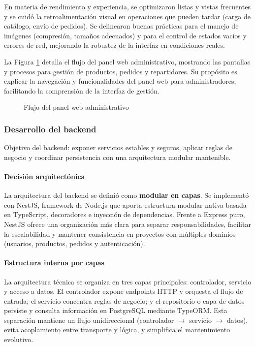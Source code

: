   En materia de rendimiento y experiencia, se optimizaron listas y vistas frecuentes y se cuidó la
  retroalimentación visual en operaciones que pueden tardar (carga de catálogo, envío de pedidos).
  Se delinearon buenas prácticas para el manejo de imágenes (compresión, tamaños adecuados) y
  para el control de estados vacíos y errores de red, mejorando la robustez de la interfaz en condiciones
  reales.

  La Figura \ref{fig:web-panel-prototipo} detalla el flujo del panel web administrativo, mostrando las pantallas y procesos para gestión de productos, pedidos y repartidores. Su propósito es explicar la navegación y funcionalidades del panel web para administradores, facilitando la comprensión de la interfaz de gestión.

  \begin{figure}[htbp]
  \centering
  \resizebox{0.95\textwidth}{!}{}
  \caption[Flujo panel web]{Flujo del panel web administrativo}
  \label{fig:web-panel-prototipo}
  \end{figure}

  \subsubsection{Desarrollo del backend }
  Objetivo del backend: exponer servicios estables y seguros, aplicar reglas de negocio y coordinar persistencia con una arquitectura modular mantenible.

  \paragraph{Decisión arquitectónica}
  La arquitectura del backend se definió como \textbf{modular en capas}. Se implementó con NestJS, framework de Node.js que aporta estructura modular nativa basada en TypeScript, decoradores e inyección de dependencias. Frente a Express puro, NestJS ofrece una organización más clara para separar responsabilidades, facilitar la escalabilidad y mantener consistencia en proyectos con múltiples dominios (usuarios, productos, pedidos y autenticación).

  \paragraph{Estructura interna por capas}
  La arquitectura técnica se organiza en tres capas principales: controlador, servicio y acceso a datos. El controlador expone endpoints HTTP y orquesta el flujo de entrada; el servicio concentra reglas de negocio; y el repositorio o capa de datos persiste y consulta información en PostgreSQL mediante TypeORM. Esta separación mantiene un flujo unidireccional (controlador $\rightarrow$ servicio $\rightarrow$ datos), evita acoplamiento entre transporte y lógica, y simplifica el mantenimiento evolutivo.

